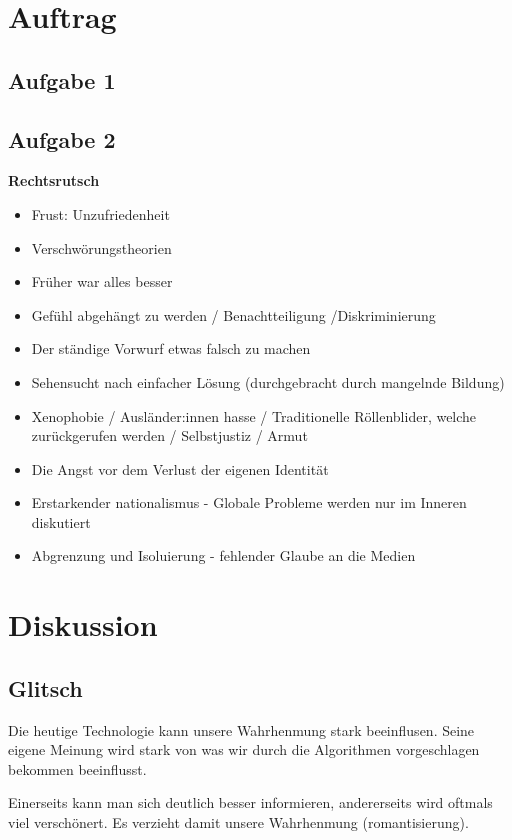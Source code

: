\documentclass{article}
\begin{document}
\section{Auftrag}
\subsection{Aufgabe 1}
\subsection{Aufgabe 2}
\textbf{Rechtsrutsch}
\begin{multicols}{2}
\begin{itemize}[parsep=0pt]
    \item Frust: Unzufriedenheit
    \item Verschwörungstheorien
    \item Früher war alles besser
    \item Gefühl abgehängt zu werden / Benachtteiligung /Diskriminierung
    \item Der ständige Vorwurf etwas falsch zu machen
    \item Sehensucht nach einfacher Lösung (durchgebracht durch mangelnde Bildung)
    \item Xenophobie / Ausländer:innen hasse / Traditionelle Röllenblider, welche zurückgerufen werden / Selbstjustiz / Armut
    \item Die Angst vor dem Verlust der eigenen Identität
    \item Erstarkender nationalismus - Globale Probleme werden nur im Inneren diskutiert
    \item Abgrenzung und Isoluierung - fehlender Glaube an die Medien
\end{itemize}
\end{multicols}
\section{Diskussion}
\subsection{Glitsch}
Die heutige Technologie kann unsere Wahrhenmung stark beeinflusen. Seine eigene Meinung wird stark von was wir durch die Algorithmen vorgeschlagen bekommen beeinflusst.

Einerseits kann man sich deutlich besser informieren, andererseits wird oftmals viel verschönert. Es verzieht damit unsere Wahrhenmung (romantisierung).
\end{document}
